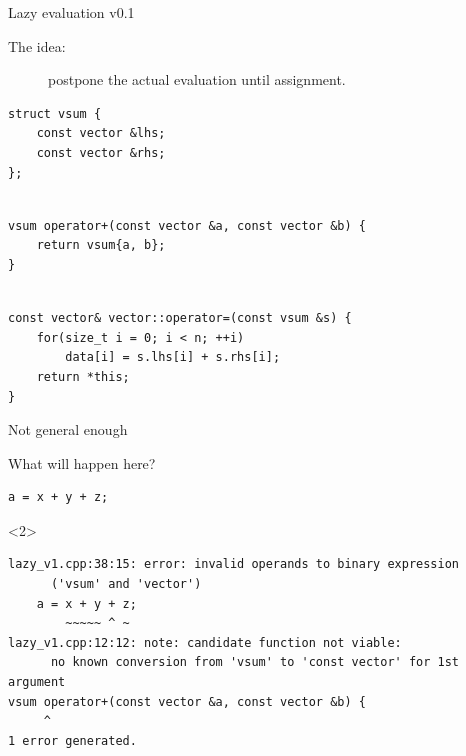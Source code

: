 \documentclass[@BEAMER_OPTIONS@]{beamer}
\begin{document}

\begin{frame}[fragile]{Lazy evaluation v0.1}
    \begin{description}
        \item[The idea:] postpone the actual evaluation until assignment.
    \end{description}
    \pause
    \begin{exampleblock}{}
        \begin{lstlisting}
struct vsum {
    const vector &lhs;
    const vector &rhs;
};
        \end{lstlisting}
        \pause
        \begin{lstlisting}[firstnumber=last]

vsum operator+(const vector &a, const vector &b) {
    return vsum{a, b};
}
        \end{lstlisting}
        \pause
        \begin{lstlisting}[firstnumber=last]

const vector& vector::operator=(const vsum &s) {
    for(size_t i = 0; i < n; ++i)
        data[i] = s.lhs[i] + s.rhs[i];
    return *this;
}
        \end{lstlisting}
    \end{exampleblock}
\end{frame}

\note{ }

\begin{frame}[fragile]{Not general enough}
    \begin{exampleblock}{What will happen here?}
        \begin{lstlisting}
a = x + y + z;
        \end{lstlisting}
    \end{exampleblock}

    \begin{exampleblock}<2>{}
        \begin{verbatim}
lazy_v1.cpp:38:15: error: invalid operands to binary expression
      ('vsum' and 'vector')
    a = x + y + z;
        ~~~~~ ^ ~
lazy_v1.cpp:12:12: note: candidate function not viable:
      no known conversion from 'vsum' to 'const vector' for 1st argument
vsum operator+(const vector &a, const vector &b) {
     ^
1 error generated.
        \end{verbatim}
    \end{exampleblock}
\end{frame}
\end{document}
